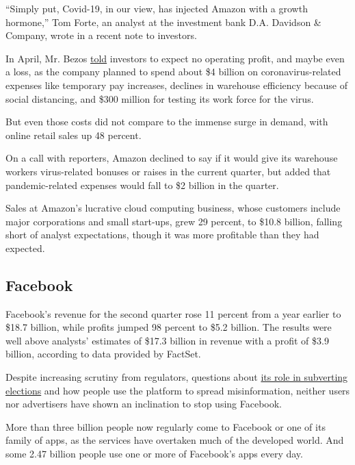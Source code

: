 ``Simply put, Covid-19, in our view, has injected Amazon with a growth
hormone,'' Tom Forte, an analyst at the investment bank D.A. Davidson \&
Company, wrote in a recent note to investors.

In April, Mr. Bezos
\href{https://www.nytimes.com/2020/04/30/technology/amazon-stock-earnings-report.html}{told}
investors to expect no operating profit, and maybe even a loss, as the
company planned to spend about \$4 billion on coronavirus-related
expenses like temporary pay increases, declines in warehouse efficiency
because of social distancing, and \$300 million for testing its work
force for the virus.

But even those costs did not compare to the immense surge in demand,
with online retail sales up 48 percent.

On a call with reporters, Amazon declined to say if it would give its
warehouse workers virus-related bonuses or raises in the current
quarter, but added that pandemic-related expenses would fall to \$2
billion in the quarter.

Sales at Amazon's lucrative cloud computing business, whose customers
include major corporations and small start-ups, grew 29 percent, to
\$10.8 billion, falling short of analyst expectations, though it was
more profitable than they had expected.

\hypertarget{facebook}{%
\subsection{Facebook}\label{facebook}}

Facebook's revenue for the second quarter rose 11 percent from a year
earlier to \$18.7 billion, while profits jumped 98 percent to \$5.2
billion. The results were well above analysts' estimates of \$17.3
billion in revenue with a profit of \$3.9 billion, according to data
provided by FactSet.

Despite increasing scrutiny from regulators, questions about
\href{https://slack-redir.net/link?url=https\%3A\%2F\%2Fwww.nytimes.com\%2F2018\%2F02\%2F17\%2Ftechnology\%2Findictment-russian-tech-facebook.html}{its
role in subverting elections} and how people use the platform to spread
misinformation, neither users nor advertisers have shown an inclination
to stop using Facebook.

More than three billion people now regularly come to Facebook or one of
its family of apps, as the services have overtaken much of the developed
world. And some 2.47 billion people use one or more of Facebook's apps
every day.

